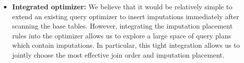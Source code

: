 {\begin{itemize}

\item \textbf{Integrated optimizer:}
  We believe that it would be relatively simple to extend an existing query optimizer to insert imputations immediately after scanning the base tables.
  However, integrating the imputation placement rules into the optimizer allows us to explore a large space of query plans which contain imputations.
  In particular, this tight integration allows us to jointly choose the most effective join order and imputation placement.
\end{itemize}
}

